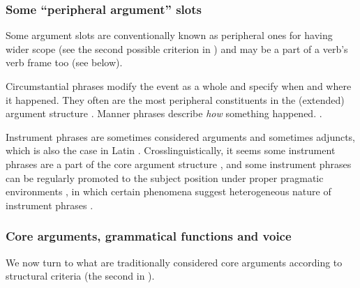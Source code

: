 \documentclass[a4paper, oneside, 12pt]{report}
\newcommand*{\citepage}[1]{p.~{#1}}
\newcommand*{\citepages}[1]{pp.~{#1}}
\begin{document}
\subsubsection{Some ``peripheral argument'' slots}

Some argument slots are conventionally known as peripheral ones for having wider scope 
(see the second possible criterion in )
and may be a part of a verb's verb frame too (see below).

Circumstantial phrases modify the event as a whole and specify when and where it happened.
They often are the most peripheral constituents in the (extended) argument structure
\citep[\citepage{29}]{cinque1999adverbs}.
Manner phrases describe \emph{how} something happened.
\citep[\citepage{71-75}, \citepages{101-109}]{devine2006latin}.

Instrument phrases are sometimes considered arguments and sometimes adjuncts,
which is also the case in Latin \citep[\citepages{57-58}, \citepage{65-67}]{devine2006latin}.
Crosslinguistically, it seems some instrument phrases are a part of the core argument structure
\citep{pascual2001syntactic},
and some instrument phrases can be regularly promoted to the subject position
under proper pragmatic environments \citep{alexiadou2008instrument},
in which certain phenomena suggest heterogeneous nature of instrument phrases \citep{wilson2020reversible}.

\subsubsection{Core arguments, grammatical functions and voice}\label{sec:grammatical.clause.core}

We now turn to what are traditionally considered core arguments according to structural criteria
(the second in ).
\end{document}
